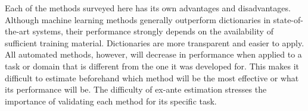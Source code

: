 Each of the methods surveyed here has its own advantages and disadvantages.
Although machine learning methods generally outperform dictionaries in state-of-the-art systems, 
their performance strongly depends on the availability of sufficient training material.
Dictionaries are more transparent and easier to apply.
All automated methods, however, will decrease in performance when applied to a task or domain
that is different from the one it was developed for. 
This makes it difficult to estimate beforehand which method will be the most effective or what its performance will be.
The difficulty of ex-ante estimation stresses the importance of validating each method for its specific task. 


